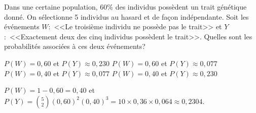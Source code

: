 \begin{questions}
\pageblanche
\question[3] Dans une certaine population, 60\% des individus possèdent un trait génétique donné. On sélectionne 5 individus au hasard et de façon indépendante. Soit les événements $W$:~<<Le troisième individu ne possède pas le trait>> et $Y$:~<<Exactement deux des cinq individus possèdent le trait>>. Quelles sont les probabilités associées à ces deux événements?

\begin{checkboxes}
\choice $P(W)=0{,}60$ et $P(Y)\approx 0{,}230$
\choice $P(W)=0{,}60$ et $P(Y)\approx 0{,}077$
\choice $P(W)=0{,}40$ et $P(Y)\approx 0{,}077$
\correctchoice $P(W)=0{,}40$ et $P(Y)\approx 0{,}230$
\end{checkboxes}
\vspace{0.5cm}
 


\begin{solution}
$P(W)=1-0{,}60=0{,}40$ et $P(Y)=\binom{5}{2}(0{,}60)^2(0{,}40)^3=10\times 0{,}36\times 0{,}064\approx 0{,}2304$.
\end{solution}


\question


\end{questions}
